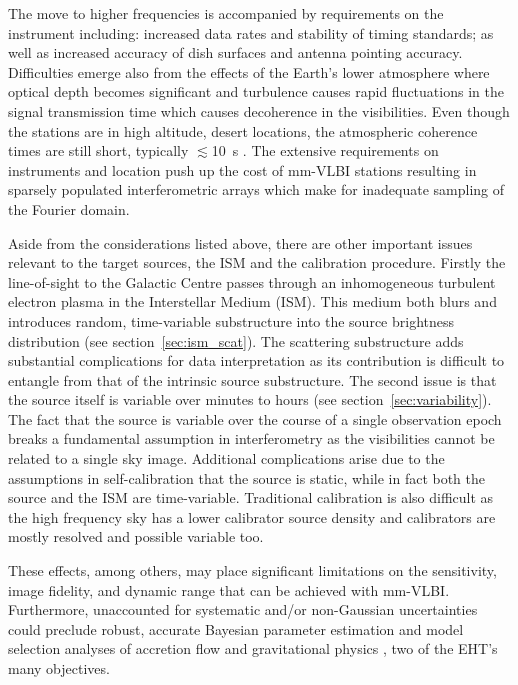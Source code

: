 
The move to higher frequencies is accompanied by requirements on the instrument including: increased data rates and stability of timing standards; as well as increased accuracy of dish surfaces and antenna pointing accuracy. Difficulties emerge also from the effects of the Earth's lower atmosphere where optical depth becomes significant and turbulence causes rapid fluctuations in the signal transmission time which causes decoherence in the visibilities. Even though the stations are in high altitude, desert locations, the atmospheric coherence times are still short, typically $\lesssim$10~s \citep{Doeleman_2009}. The extensive requirements on instruments and location push up the cost of mm-VLBI stations resulting in sparsely populated interferometric arrays which make for inadequate sampling of the Fourier domain. 




Aside from the considerations listed above, there are other important issues relevant to the target sources, the ISM and the calibration procedure. Firstly the line-of-sight to the Galactic Centre passes through an inhomogeneous turbulent electron plasma in the Interstellar Medium (ISM). This medium both blurs and introduces random, time-variable substructure into the source brightness distribution (see section~\ref{sec:ism_scat}). The scattering substructure adds substantial complications for data interpretation as its contribution is difficult to entangle from that of the intrinsic source substructure. The second issue is that the source itself is variable over minutes to hours (see section~\ref{sec:variability}). The fact that the source is variable over the course of a single observation epoch breaks a fundamental assumption in interferometry as the visibilities cannot be related to a single sky image. Additional complications arise due to the assumptions in self-calibration that the source is static, while in fact both the source and the ISM are time-variable. Traditional calibration is also difficult as the high frequency sky has a lower calibrator source density and calibrators are mostly resolved and possible variable too. 


These effects, among others, may place significant limitations on the sensitivity, image fidelity, and dynamic range that can be achieved with mm-VLBI.  Furthermore, unaccounted for systematic and/or non-Gaussian uncertainties could preclude robust, accurate Bayesian parameter estimation and model selection analyses of accretion flow \citep[e.g.][]{Broderick_2016} and gravitational physics \citep[e.g.][]{Broderick_2014, Psaltis_2016}, two of the EHT's many objectives. 


